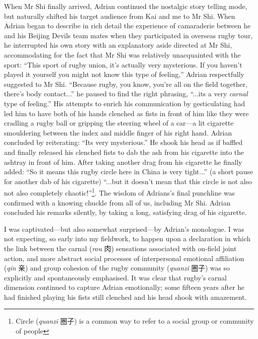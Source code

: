 \begin{CJK}{UTF8}{gbsn}
When Mr Shi finally arrived, Adrian continued the nostalgic story telling mode, but naturally shifted his target audience from Kai and me to Mr Shi.  When Adrian began to describe in rich detail the experience of camaraderie between he and his Beijing Devils team mates when they participated in overseas rugby tour, he interrupted his own story with an explanatory aside directed at Mr Shi, accommodating for the fact that Mr Shi was relatively unacquainted with the sport: ``This sport of rugby union, it's actually very mysterious. If you haven't played it yourself you might not know this type of feeling,'' Adrian respectfully suggested to Mr Shi.  ``Because rugby, you know, you're all on the field together, there's body contact...'' he paused to find the right phrasing,  ``...its a very \textit{carnal} type of feeling.''  His attempts to enrich his communication by gesticulating had led him to have both of his hands clenched as fists in front of him like they were cradling a rugby ball or gripping the steering wheel of a car---a lit cigarette smouldering between the index and middle finger of his right hand.  Adrian concluded by reiterating: ``Its very mysterious.'' He shook his head as if baffled and finally released his clenched fists to dab the ash from his cigarette into the ashtray in front of him.  After taking another drag from his cigarette he finally added: ``So it means this rugby circle here in China is very tight...'' (a short pause for another dab of his cigarette) ``...but it doesn't mean that this circle is not also not also completely chaotic!''\footnote{Circle (\textit{quanzi} 圈子) is a common way to refer to a social group or community of people}.  The wisdom of Adrians's final punchline was confirmed with a knowing chuckle from all of us, including Mr Shi. Adrian concluded his remarks silently, by taking a long, satisfying drag of his cigarette.


I was captivated---but also somewhat surprised---by Adrian's monologue.  I was not expecting, so early into my fieldwork, to happen upon a declaration in which the link between the carnal (\textit{rou} 肉) sensations associated with on-field joint action, and more abstract social processes of interpersonal emotional affiliation (\textit{qin} 亲) and group cohesion of the rugby community (\textit{quanzi} 圈子) was so explicitly and spontaneously emphasised.  It was clear that rugby's carnal dimension continued to capture Adrian emotionally; some fifteen years after he had finished playing his fists still clenched and his head shook with amazement.


\end{CJK}
